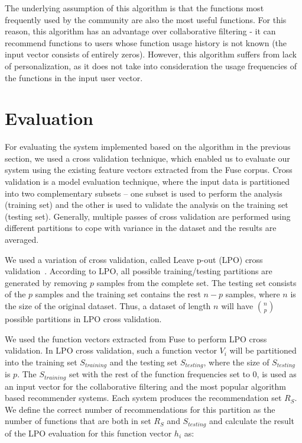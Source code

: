 \documentclass[conference]{IEEEtran}
\begin{document}
The underlying assumption of this algorithm is that the functions most frequently used by the community are also the most useful functions. For this reason, this algorithm has an advantage over collaborative filtering - it can recommend functions to users whose function usage history is not known (the input vector consists of entirely zeros). However, this algorithm suffers from lack of personalization, as it does not take into consideration the usage frequencies of the functions in the input user vector.

\section{Evaluation}
For evaluating the system implemented based on the algorithm in the previous section, we used a cross validation technique, which enabled us to evaluate our system using the existing feature vectors extracted from the Fuse corpus. Cross validation is a model evaluation technique, where the input data is partitioned into two complementary subsets -- one subset is used to perform the analysis (training set) and the other is used to validate the analysis on the training set (testing set). Generally, multiple passes of cross validation are performed using different partitions  to cope with variance in the dataset and the results are averaged.

We used a variation of cross validation, called Leave p-out (LPO) cross validation~\cite{arlot2010survey}. According to LPO, all possible training/testing partitions are generated by removing $p$ samples from the complete set. The testing set consists of the $p$ samples and the training set contains the rest $n-p$ samples, where $n$ is the size of the original dataset. Thus, a dataset of length $n$ will have $n \choose p$ possible partitions in LPO cross validation.

We used the function vectors extracted from Fuse to perform LPO cross validation. In LPO cross validation, such a function vector $V_i$ will be partitioned into the training set $S_{training}$ and the testing set $S_{testing}$, where the size of $S_{testing}$ is $p$. The $S_{training}$ set with the rest of the function frequencies set to 0, is used as an input vector for the collaborative filtering and the most popular algorithm based recommender systems. Each system produces the recommendation set $R_S$. We define the correct number of recommendations for this partition as the number of functions that are both in set $R_S$ and $S_{testing}$ and calculate the result of the LPO evaluation for this function vector $h_i$ as:
\end{document}
